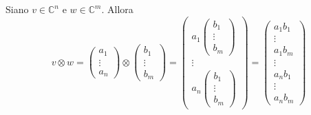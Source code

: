 \begin{esempio}
Siano $v \in \mathbb{C}^n$ e $w\in \mathbb{C}^m$. Allora
\begin{equation*}
    v \otimes w =
    \begin{pmatrix} a_1 \\ \vdots \\ a_n \end{pmatrix} \otimes     \begin{pmatrix} b_1 \\ \vdots \\ b_m \end{pmatrix} = 
    \begin{pmatrix}
    a_1 \begin{pmatrix}
        b_1 \\
        \vdots\\
        b_m
        \end{pmatrix} \\
    \vdots \\
    a_n \begin{pmatrix}
        b_1 \\
        \vdots\\
        b_m
        \end{pmatrix}
    \end{pmatrix} =
    \begin{pmatrix}
    a_1 b_1 \\ \vdots \\ a_1 b_m \\ \vdots \\ a_n b_1 \\ \vdots \\ a_n b_m
    \end{pmatrix}
\end{equation*}
\end{esempio}


